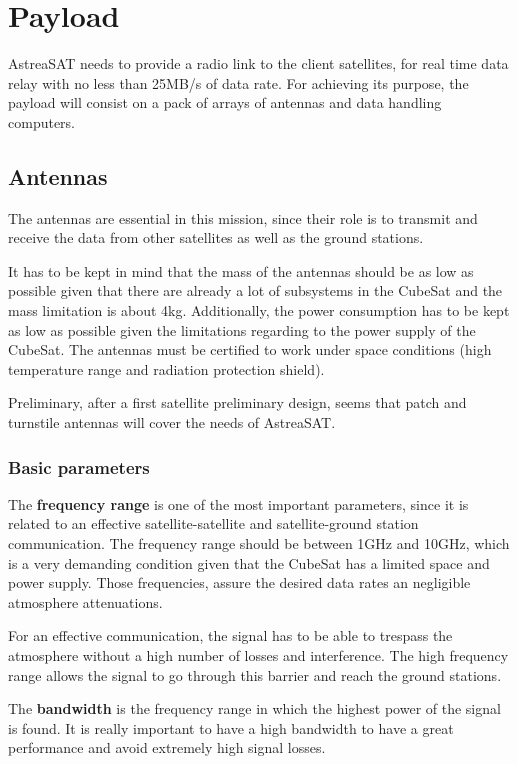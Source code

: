 \section{Payload}
AstreaSAT needs to provide a radio link to the client satellites, for real time data relay with no less than 25MB/s of data rate. For achieving its purpose, the payload will consist on a pack of arrays of antennas and data handling computers.

\subsection{Antennas}
The antennas are essential in this mission, since their role is to transmit and receive the data from other satellites as well as the ground stations.

It has to be kept in mind that the mass of the antennas should be as low as possible given that there are already a lot of subsystems in the CubeSat and the mass limitation is about 4kg. Additionally, the power consumption has to be kept as low as possible given the limitations regarding to the power supply of the CubeSat. The antennas must be certified to work under space conditions (high temperature range and radiation protection shield).

Preliminary, after a first satellite preliminary design, seems that patch and turnstile antennas will cover the needs of AstreaSAT.  

\subsubsection{Basic parameters}
The \textbf{frequency range} is one of the most important parameters, since it is related to an effective satellite-satellite and satellite-ground station communication. The frequency range should be between 1GHz and 10GHz, which is a very demanding condition given that the CubeSat has a limited space and power supply. Those frequencies, assure the desired data rates an negligible atmosphere attenuations.

For an effective communication, the signal has to be able to trespass the atmosphere without a high number of losses and interference. The high frequency range allows the signal to go through this barrier and reach the ground stations.

The \textbf{bandwidth} is the frequency range in which the highest power of the signal is found. It is really important to have a high bandwidth to have a great performance and avoid extremely high signal losses.

